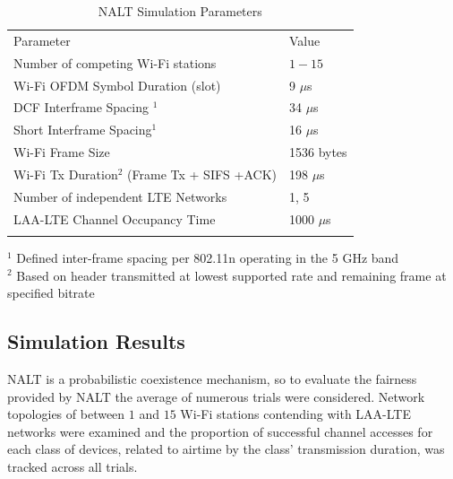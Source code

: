 \begin{table}
	\caption{NALT Simulation Parameters}
	\label{params}      
	\begin{tabular}{p{}p{}}
		\hline\noalign{\smallskip}
		Parameter & Value \\
		\noalign{\smallskip}\svhline\noalign{\smallskip}
		Number of competing \mbox{\mbox{Wi-Fi}} stations& $1 - 15$ \\ 
		\mbox{Wi-Fi} OFDM Symbol Duration (slot) & 9 $\mu$s    \\ 
		DCF Interframe Spacing $^1$ & 34 $\mu$s   \\ 
		Short Interframe Spacing$^1$ & 16 $\mu$s   \\ 
		\mbox{\mbox{Wi-Fi}} Frame Size & 1536 bytes  \\ 
		\mbox{\mbox{Wi-Fi}} Tx Duration$^2$ (Frame Tx + SIFS +ACK) & 198 $\mu$s   \\ 
		Number of independent LTE Networks & 1, 5 \\
		\mbox{\mbox{LAA-LTE}} Channel Occupancy Time  & 1000 $\mu$s \\ 	
		\noalign{\smallskip}\hline\noalign{\smallskip}
	\end{tabular}
	$^1$ Defined inter-frame spacing per 802.11n operating in the 5 GHz band \\
	$^2$ Based on header transmitted at lowest supported rate and remaining frame at specified bitrate	 
\end{table}

\subsection{Simulation Results}
\label{sim-results}
NALT is a probabilistic coexistence mechanism, so to evaluate the fairness provided by NALT the average of numerous trials were considered.  Network topologies of between $1$ and $15$ \mbox{\mbox{Wi-Fi}} stations contending with \mbox{\mbox{LAA-LTE}} networks were examined and the proportion of successful channel accesses for each class of devices, related to airtime by the class' transmission duration, was tracked across all trials.  

